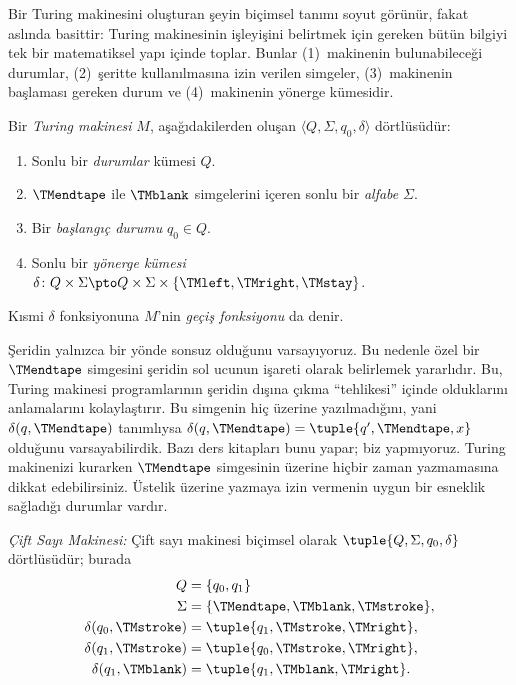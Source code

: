 \documentclass[../../../include/open-logic-section]{subfiles}
\begin{document}

\begin{explain}
Bir Turing makinesini oluşturan şeyin biçimsel tanımı soyut görünür, fakat
aslında basittir: Turing makinesinin işleyişini belirtmek için gereken bütün
bilgiyi tek bir matematiksel yapı içinde toplar. Bunlar (1)~makinenin
bulunabileceği durumlar, (2)~şeritte kullanılmasına izin verilen simgeler,
(3)~makinenin başlaması gereken durum ve (4)~makinenin yönerge kümesidir.
\end{explain}

\begin{defn}
Bir \emph{Turing makinesi} $M$, aşağıdakilerden oluşan
$\langle Q,\Sigma,q_0,\delta\rangle$ dörtlüsüdür:
\begin{enumerate}
\item Sonlu bir \emph{durumlar} kümesi $Q$.
\item $\TMendtape$ ile $\TMblank$ simgelerini içeren sonlu bir
  \emph{alfabe} $\Sigma$.
\item Bir \emph{başlangıç durumu} $q_0\in Q$.
\item Sonlu bir \emph{yönerge kümesi}
  $\delta\colon Q\times\Sigma\pto
  Q\times\Sigma\times\{\TMleft,\TMright,\TMstay\}$.
\end{enumerate}
Kısmi $\delta$ fonksiyonuna $M$'nin \emph{geçiş fonksiyonu} da denir.
\end{defn}

\begin{explain}
Şeridin yalnızca bir yönde sonsuz olduğunu varsayıyoruz. Bu nedenle özel bir
$\TMendtape$ simgesini şeridin sol ucunun işareti olarak belirlemek
yararlıdır. Bu, Turing makinesi programlarının şeridin dışına çıkma
``tehlikesi'' içinde olduklarını anlamalarını kolaylaştırır. Bu simgenin hiç
üzerine yazılmadığını, yani $\delta(q,\TMendtape)$ tanımlıysa
$\delta(q,\TMendtape)=\tuple{q',\TMendtape,x}$ olduğunu varsayabilirdik.
Bazı ders kitapları bunu yapar; biz yapmıyoruz. Turing makinenizi kurarken
$\TMendtape$ simgesinin üzerine hiçbir zaman yazmamasına dikkat edebilirsiniz.
Üstelik üzerine yazmaya izin vermenin uygun bir esneklik sağladığı durumlar
vardır.
\end{explain}

\begin{ex}
\emph{Çift Sayı Makinesi:} Çift sayı makinesi biçimsel olarak
$\tuple{Q,\Sigma,q_0,\delta}$ dörtlüsüdür; burada
\begin{align*}
Q & = \{q_0,q_1\}\\
\Sigma & = \{\TMendtape,\TMblank,\TMstroke\},\\
\delta(q_0,\TMstroke) & = \tuple{q_1,\TMstroke,\TMright},\\
\delta(q_1,\TMstroke) & = \tuple{q_0,\TMstroke,\TMright},\\
\delta(q_1,\TMblank) & = \tuple{q_1,\TMblank,\TMright}.
\end{align*}
\end{ex}
\end{document}
